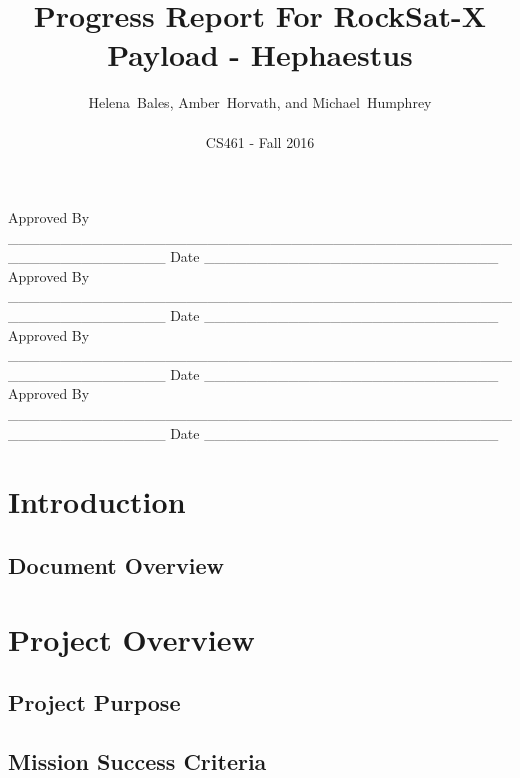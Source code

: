 \documentclass[letterpaper,10pt]{article}
\title{Progress Report For RockSat-X Payload - Hephaestus}
\author{Helena~Bales, Amber~Horvath, and Michael~Humphrey\\ \\ CS461 - Fall 2016}
\newenvironment{bottompar}{\par\vspace*{\fill}}{\clearpage}
\begin{document}
\maketitle

\begin{abstract}
\end{abstract}

\begin{bottompar}
Approved By
\_\_\_\_\_\_\_\_\_\_\_\_\_\_\_\_\_\_\_\_\_\_\_\_\_\_\_\_\_\_\_\_\_\_\_\_\_\_\_\_\_\_\_\_\_\_\_\_\_\_\_\_\_\_\_\_\_\_\_\_\_\_\_
Date \_\_\_\_\_\_\_\_\_\_\_\_\_\_\_\_\_\_\_\_\_\_\_\_\_\_\_\_ \\


Approved By
\_\_\_\_\_\_\_\_\_\_\_\_\_\_\_\_\_\_\_\_\_\_\_\_\_\_\_\_\_\_\_\_\_\_\_\_\_\_\_\_\_\_\_\_\_\_\_\_\_\_\_\_\_\_\_\_\_\_\_\_\_\_\_
Date \_\_\_\_\_\_\_\_\_\_\_\_\_\_\_\_\_\_\_\_\_\_\_\_\_\_\_\_ \\


Approved By
\_\_\_\_\_\_\_\_\_\_\_\_\_\_\_\_\_\_\_\_\_\_\_\_\_\_\_\_\_\_\_\_\_\_\_\_\_\_\_\_\_\_\_\_\_\_\_\_\_\_\_\_\_\_\_\_\_\_\_\_\_\_\_
Date \_\_\_\_\_\_\_\_\_\_\_\_\_\_\_\_\_\_\_\_\_\_\_\_\_\_\_\_ \\


Approved By
\_\_\_\_\_\_\_\_\_\_\_\_\_\_\_\_\_\_\_\_\_\_\_\_\_\_\_\_\_\_\_\_\_\_\_\_\_\_\_\_\_\_\_\_\_\_\_\_\_\_\_\_\_\_\_\_\_\_\_\_\_\_\_
Date \_\_\_\_\_\_\_\_\_\_\_\_\_\_\_\_\_\_\_\_\_\_\_\_\_\_\_\_ \\
\end{bottompar}

\clearpage
\tableofcontents
\clearpage

\section{Introduction}
\subsection{Document Overview}
\section{Project Overview}
\subsection{Project Purpose}
\subsection{Mission Success Criteria}
\end{document}
